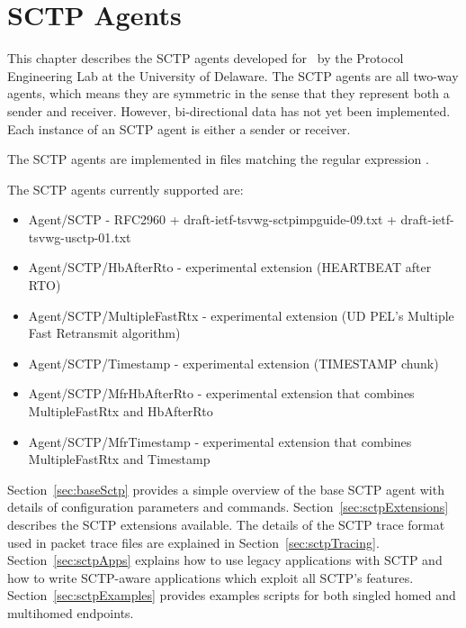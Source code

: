 \chapter{SCTP Agents}
\label{sec:sctpAgents}

   This chapter describes the SCTP agents developed for \ns~by the
   Protocol Engineering Lab at the University of Delaware.  The SCTP
   agents are all two-way agents, which means they are symmetric in the
   sense that they represent both a sender and receiver. However,
   bi-directional data has not yet been implemented. Each instance of an
   SCTP agent is either a sender or receiver.

   The SCTP agents are implemented in files matching the regular
   expression .

   The SCTP agents currently supported are:

   \begin{itemize}\itemsep0pt

      \item Agent/SCTP - RFC2960 + draft-ietf-tsvwg-sctpimpguide-09.txt
       + draft-ietf-tsvwg-usctp-01.txt 

      \item Agent/SCTP/HbAfterRto - experimental extension (HEARTBEAT
      after RTO)

      \item Agent/SCTP/MultipleFastRtx - experimental extension (UD PEL's
      Multiple Fast Retransmit algorithm)

      \item Agent/SCTP/Timestamp - experimental extension (TIMESTAMP chunk)

      \item Agent/SCTP/MfrHbAfterRto - experimental extension that
      combines MultipleFastRtx and HbAfterRto

      \item Agent/SCTP/MfrTimestamp - experimental extension that
      combines MultipleFastRtx and Timestamp

   \end{itemize}

   Section~\ref{sec:baseSctp} provides a simple overview of the base SCTP
   agent with details of configuration parameters and
   commands. Section~\ref{sec:sctpExtensions} describes the SCTP
   extensions available. The details of the SCTP trace format used in
   packet trace files are explained in
   Section~\ref{sec:sctpTracing}. Section~\ref{sec:sctpApps} explains how
   to use legacy applications with SCTP and how to write SCTP-aware
   applications which exploit all SCTP's
   features. Section~\ref{sec:sctpExamples} provides examples scripts for
   both singled homed and multihomed endpoints.


